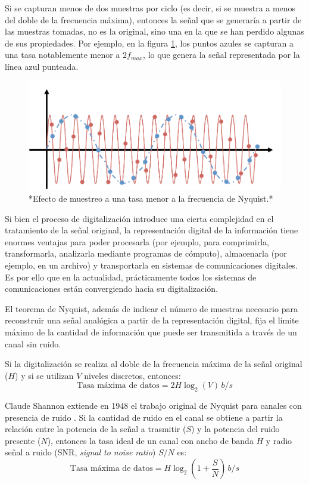 \documentclass[
]{book}
\begin{document}
Si se capturan menos de dos muestras por ciclo (es decir, si se muestra a menos del doble de la frecuencia máxima), entonces la señal que se generaría a partir de las muestras tomadas, no es la original, sino una en la que se han perdido algunas de sus propiedades. Por ejemplo, en la figura \ref{fig:nyqalias}, los puntos azules se capturan a una tasa notablemente menor a \(2f_{max}\), lo que genera la señal representada por la línea azul punteada.

\begin{figure}

{\centering \includegraphics{figuras/c1/nyquistAlias-1} 

}

\caption{*Efecto de muestreo a una tasa menor a la frecuencia de Nyquist.*}\label{fig:nyqalias}
\end{figure}

Si bien el proceso de digitalización introduce una cierta complejidad en el tratamiento de la señal original, la representación digital de la información tiene enormes ventajas para poder procesarla (por ejemplo, para comprimirla, transformarla, analizarla mediante programas de cómputo), almacenarla (por ejemplo, en un archivo) y transportarla en sistemas de comunicaciones digitales. Es por ello que en la actualidad, prácticamente todos los sistemas de comunicaciones están convergiendo hacia su digitalización.

El teorema de Nyquist, además de indicar el número de muestras necesario para reconstruir una señal analógica a partir de la representación digital, fija el límite máximo de la cantidad de información que puede ser transmitida a través de un canal sin ruido.

Si la digitalización se realiza al doble de la frecuencia máxima de la señal original (\(H\)) y si se utilizan \(V\) niveles discretos, entonces:
\[
\text{Tasa máxima de datos} = 2H \log_2 (V)\,b/s
\]

Claude Shannon extiende en 1948 el trabajo original de Nyquist para canales con presencia de ruido \citep{Tanenbaum:CN}. Si la cantidad de ruido en el canal se obtiene a partir la relación entre la potencia de la señal a trasmitir (\(S\)) y la potencia del ruido presente (\(N\)), entonces la tasa ideal de un canal con ancho de banda \(H\) y radio señal a ruido (SNR, \emph{signal to noise ratio}) \(S/N\) es:
\[
\text{Tasa máxima de datos} = H  \log_2 (1 + \frac{S}{N})\,b/s
\]
\end{document}
